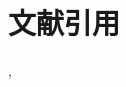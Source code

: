 \documentclass[
  letterpaper,
  DIV=11,
  pandoc,
  ja=standard,
  jafont=noto-otf]{bxjsarticle}
\begin{document}
\hypertarget{ux6587ux732eux5f15ux7528}{%
\section{文献引用}\label{ux6587ux732eux5f15ux7528}}

\autocite{R-quarto}, \textcite{R-rmdja}

\printbibliography[title=参考文献]
\end{document}
